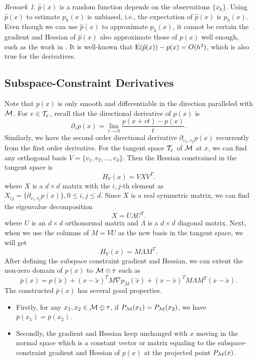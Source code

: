 \documentclass[aos,preprint]{imsart}
\theoremstyle{remark}
\newtheorem*{remark}{Remark}
\begin{document}
\begin{remark}   
 $\hat{p}(x)$ is a random function depends on the observations $\{x_k\}$. Using $\hat{p}(x)$ to estimate $p_h(x)$ is unbiased, i.e., the expectation of $\hat{p}(x)$ is $p_h(x)$. Even though we can use $ \hat{p}(x)$ to approximate $p_h(x)$, it cannot be certain the gradient and Hessian of $\hat{p}(x)$ also approximate those of $p(x)$ well enough, such as the work in \cite{sasaki2017mode}. It is well-known that ${\rm E}(\hat{p}(x))-p(x) = O(h^2)$, which is also true for the derivatives.
\end{remark}


\subsection{Subspace-Constraint Derivatives}
Note that $p(x)$ is only smooth and differentiable in the direction paralleled with $\cal M$. For $v\in {\cal T}_x$, recall that the directional derivative of $p(x)$ is
\[
 \partial_v p(x) = \lim_{t\rightarrow 0} \frac{p(x+vt)-p(x)}{t}.
\]
Similarly, we have the second order directional derivative $\partial_{v_1,v_2}p(x)$ recurrently from the first order derivative. For the tangent space ${\cal T}_x$ of $\cal M$ at $x$, we can find any orthogonal basis $V = \{v_1, v_2,..., v_d\}$. Then the Hessian constrained in the tangent space is
\[
H_{ V}(x) = V X V^T.
\]
where $X$ is a $d\times d$ matrix with the $i,j$-th element as $X_{ij}=  \{ \partial_{v_i,v_j} p(x )\}, 0\leq i,j \leq d$. Since $X$ is a real symmetric matrix, we can find the eigenvalue decomposition 
\[
X = U \Lambda U^T.
\]
where $U$ is an $d\times d$ orthonormal matrix and $\Lambda$ is a $d\times d$ diagonal matrix. Next, when we use the columns of $M = VU$ as the new basis in the tangent space, we will get 
\[
H_{V}(x) = M \Lambda M^T.
\]
After defining the subspace constraint gradient and Hessian, we can extent the non-zero domain of $p(x)$ to  $\cal M\oplus \tau$ such as
\[
\bar{p}(x) = p(\tilde{x}) + (x-\tilde{x})^T M \nabla p_M (\tilde{x}) +  (x-\tilde{x})^TM\Lambda M^T (x-\tilde{x}).
\]
The constructed $\bar{p}(x)$ has several good properties. 
\begin{itemize}
\item Firstly, for any $x_1,x_2 \in \cal M\oplus \tau$, if $P_{\cal M}(x_1) = P_{\cal M}(x_2)$, we have $\bar{p}(x_1) = \bar{p}(x_2)$. 
\item Secondly, the gradient and Hessian keep unchanged with $x$ moving in the normal space which is a constant vector or matrix equaling to the subspace-constraint gradient and Hessian of $p(x)$ at the projected point $P_{\cal M}(x)$.
\end{itemize}
\end{document}
